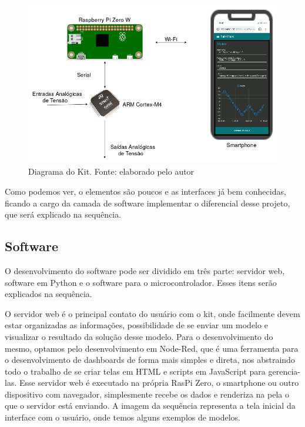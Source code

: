 \documentclass[journal]{IEEEtranTIE}
\begin{document}
\begin{figure}[H]
	\includegraphics[width=\linewidth]{img/diagrama.png}
    \caption{Diagrama do Kit. Fonte: elaborado pelo autor}
    \label{fig:real}
\end{figure}

Como podemos ver, o elementos são poucos e as interfaces já bem conhecidas, ficando a cargo da camada de software implementar o diferencial desse projeto, que será explicado na sequência.

\subsection{Software}

O desenvolvimento do software pode ser dividido em três parte: servidor web, software em Python e o software para o microcontrolador. Esses itens serão explicados na sequência.

O servidor web é o principal contato do usuário com o kit, onde facilmente devem estar organizadas as informações, possibilidade de se enviar um modelo e visualizar o resultado da solução desse modelo. Para o desenvolvimento do mesmo, optamos pelo desenvolvimento em Node-Red, que é uma ferramenta para o desenvolvimento de dashboards de forma mais simples e direta, nos abstraindo todo o trabalho de se criar telas em HTML e scripts em JavaScript para gerencia-las. Esse servidor web é executado na própria RasPi Zero, o smartphone ou outro dispositivo com navegador, simplesmente recebe os dados e renderiza na pela o que o servidor está enviando. A imagem da sequência representa a tela inicial da interface com o usuário, onde temos alguns exemplos de modelos.
\end{document}
